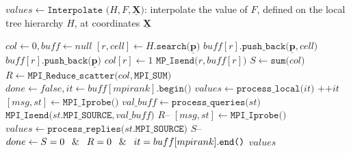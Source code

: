 \begin{algorithm}[htbp]
\caption{$values \gets \texttt{Interpolate (}H, F, \underline{\mathbf{X}}\texttt{)}$: interpolate the value of $F$, defined on the local tree hierarchy $H$, at coordinates $\underline{\mathbf{X}}$}
\begin{algorithmic}[1]
\State $col \gets 0, buff \gets null$ 
	\State $[r, cell] \gets H.\texttt{search(}\underline{\mathbf{p}}\texttt{)}$ 
		\State $buff[r].\texttt{push\_back(}\underline{\mathbf{p}}, cell\texttt{)}$
	\Else
		\State $buff[r].\texttt{push\_back(}\underline{\mathbf{p}}\texttt{)}$
		\State $col[r] \gets 1$
	\EndIf
\EndFor
{} 
		\State $\texttt{MP\_Isend(}r, buff[r]\texttt{)}$
	\EndIf
\EndFor
\State  $S \gets \texttt{sum(}col\texttt{)}$ 
\State  $R \gets \texttt{MPI\_Reduce\_scatter(}col,\texttt{MPI\_SUM)}$
\State $done \gets false, it \gets buff[mpirank].\texttt{begin()}$
 
		\State $values \gets \texttt{process\_local(}it\texttt{)}$ 
		\State $\texttt{++}it$
	\EndIf
	 
		\State $[msg, st] \gets \texttt{MPI\_Iprobe()}$
			\State $val\_buff \gets \texttt{process\_queries(}st\texttt{)}$ 
			\State $\texttt{MPI\_Isend(}st.\texttt{MPI\_SOURCE},val\_buff\texttt{)}$ 
			\State $R\texttt{--}$
		\EndIf
	\EndIf
	 
		\State $[msg, st] \gets \texttt{MPI\_Iprobe()}$
			\State $values \gets \texttt{process\_replies(}st.\texttt{MPI\_SOURCE)}$ 
			\State $S\texttt{--}$
		\EndIf
	\EndIf
	\State $done \gets S = 0 \: \And \: R = 0 \: \And \: it = buff[mpirank].\texttt{end()}$
\EndWhile
\State \Return $values$
\end{algorithmic}
\label{alg:interpolation}
\end{algorithm}

